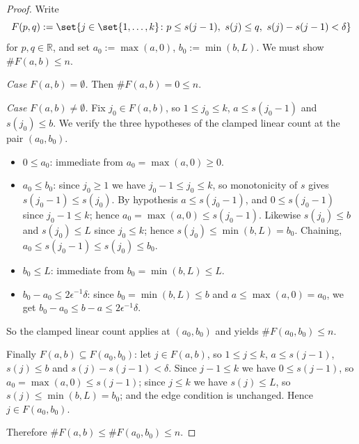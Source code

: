 \begin{proof}
  Write
  \[
    F(p,q) := \set{ j \in \set{1,\dots,k} \colon p \le s(j-1),\ s(j) \le q,\ s(j)-s(j-1) < \delta }
  \]
  for $p,q \in \mathbb{R}$, and set $a_0 := \max(a,0)$, $b_0 := \min(b,L)$. We must show
  $\# F(a,b) \le n$.

  \emph{Case $F(a,b) = \emptyset$.} Then $\# F(a,b) = 0 \le n$.

  \emph{Case $F(a,b) \ne \emptyset$.} Fix $j_0 \in F(a,b)$, so $1 \le j_0 \le k$,
  $a \le s(j_0-1)$ and $s(j_0) \le b$. We verify the three hypotheses of the clamped linear count
  at the pair $(a_0,b_0)$.
  \begin{itemize}
    \item $0 \le a_0$: immediate from $a_0 = \max(a,0) \ge 0$.
    \item $a_0 \le b_0$: since $j_0 \ge 1$ we have $j_0 - 1 \le j_0 \le k$, so monotonicity of $s$
      gives $s(j_0-1) \le s(j_0)$. By hypothesis $a \le s(j_0-1)$, and $0 \le s(j_0-1)$ since
      $j_0-1 \le k$; hence $a_0 = \max(a,0) \le s(j_0-1)$. Likewise $s(j_0) \le b$ and
      $s(j_0) \le L$ since $j_0 \le k$; hence $s(j_0) \le \min(b,L) = b_0$. Chaining,
      $a_0 \le s(j_0-1) \le s(j_0) \le b_0$.
    \item $b_0 \le L$: immediate from $b_0 = \min(b,L) \le L$.
    \item $b_0 - a_0 \le 2\epsilon^{-1}\delta$: since $b_0 = \min(b,L) \le b$ and
      $a \le \max(a,0) = a_0$, we get $b_0 - a_0 \le b - a \le 2\epsilon^{-1}\delta$.
  \end{itemize}
  So the clamped linear count applies at $(a_0,b_0)$ and yields $\# F(a_0,b_0) \le n$.

  Finally $F(a,b) \subseteq F(a_0,b_0)$: let $j \in F(a,b)$, so $1 \le j \le k$, $a \le s(j-1)$,
  $s(j) \le b$ and $s(j)-s(j-1) < \delta$. Since $j-1 \le k$ we have $0 \le s(j-1)$, so
  $a_0 = \max(a,0) \le s(j-1)$; since $j \le k$ we have $s(j) \le L$, so
  $s(j) \le \min(b,L) = b_0$; and the edge condition is unchanged. Hence $j \in F(a_0,b_0)$.

  Therefore $\# F(a,b) \le \# F(a_0,b_0) \le n$.
\end{proof}
